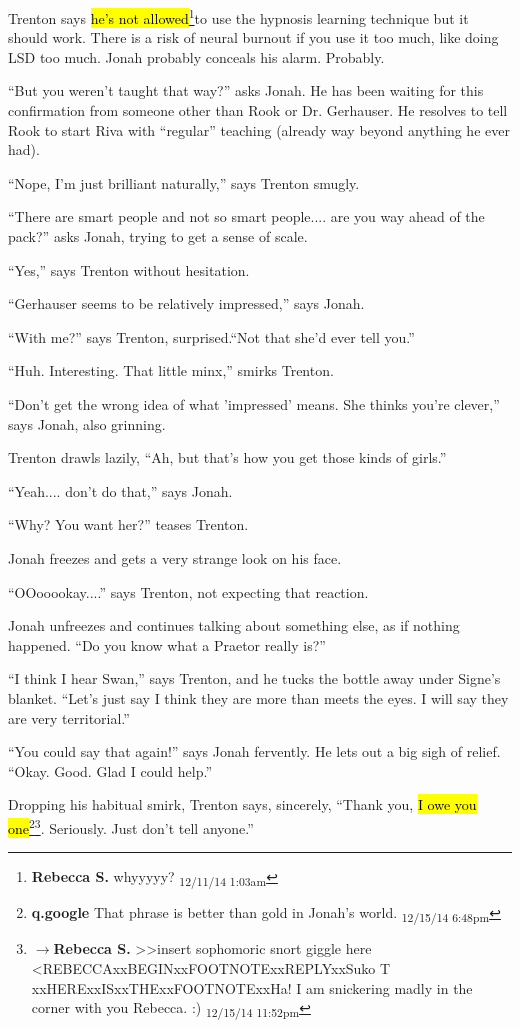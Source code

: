 Trenton says \hl{he's not allowed}\footnote{\textbf{Rebecca S. }whyyyyy? \textsubscript{12/11/14 1:03am}}to use the hypnosis learning technique but it should work.  There is a risk of neural burnout if you use it too much, like doing LSD too much. Jonah probably conceals his alarm.  Probably. 

``But you weren't taught that way?'' asks Jonah.   He has been waiting for this confirmation from someone other than Rook or Dr. Gerhauser.  He resolves to tell Rook to start Riva with ``regular'' teaching (already way beyond anything he ever had).

``Nope, I'm just brilliant naturally,'' says Trenton smugly.

``There are smart people and not so smart people.... are you way ahead of the pack?'' asks Jonah, trying to get a sense of scale.

``Yes,'' says Trenton without hesitation.

``Gerhauser seems to be relatively impressed,'' says Jonah.

``With me?'' says Trenton, surprised.``Not that she'd ever tell you.''

``Huh.  Interesting.  That little minx,'' smirks Trenton.

``Don't get the wrong idea of what 'impressed' means.  She thinks you're clever,'' says Jonah, also grinning.

Trenton drawls lazily, ``Ah, but that's how you get those kinds of girls.''

``Yeah.... don't do that,'' says Jonah.

``Why?  You want her?'' teases Trenton.

Jonah freezes and gets a very strange look on his face.  

``OOooookay....'' says Trenton, not expecting that reaction.

Jonah unfreezes and continues talking about something else, as if nothing happened.  ``Do you know what a Praetor really is?''

``I think I hear Swan,'' says Trenton, and he tucks the bottle away under Signe's blanket. ``Let's just say I think they are more than meets the eyes.  I will say they are very territorial.''  

``You could say that again!'' says Jonah fervently.  He lets out a big sigh of relief.  ``Okay.  Good.  Glad I could help.''

Dropping his habitual smirk, Trenton says, sincerely, ``Thank you, \hl{I owe you one}\footnote{\textbf{q.google }That phrase is better than gold in Jonah's world. \textsubscript{12/15/14 6:48pm}}\footnote{$\rightarrow$\textbf{Rebecca S. }\textgreater \textgreater  insert sophomoric snort giggle here \textless REBECCAxxBEGINxxFOOTNOTExxREPLYxxSuko T xxHERExxISxxTHExxFOOTNOTExxHa!  I am snickering madly in the corner with you Rebecca. :) \textsubscript{12/15/14 11:52pm}}.  Seriously.  Just don't tell anyone.''

